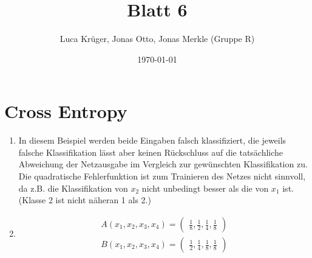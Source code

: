 \documentclass{article}
\title{Blatt 6}
\author{Luca Krüger, Jonas Otto, Jonas Merkle (Gruppe R)}
\date{\today}
\begin{document}
\maketitle

\section{Cross Entropy}

\begin{enumerate}
  \item
        In diesem Beispiel werden beide Eingaben falsch klassifiziert, die jeweils falsche Klassifikation lässt aber keinen Rückschluss auf die tatsächliche Abweichung der Netzausgabe im Vergleich zur gewünschten Klassifikation zu. Die quadratische Fehlerfunktion ist zum Trainieren des Netzes nicht sinnvoll, da z.B. die Klassifikation von $x_2$ nicht unbedingt besser als die von $x_1$ ist. (Klasse 2 ist nicht \glqq näher\grqq an 1 als 2.)
  \item
        \begin{align*}
          A(x_1,x_2,x_3,x_4)=\begin{pmatrix}\frac{1}{8}, \frac{1}{2}, \frac{1}{4}, \frac{1}{8}\end{pmatrix} \\
          B(x_1,x_2,x_3,x_4)=\begin{pmatrix}\frac{1}{2}, \frac{1}{4}, \frac{1}{8}, \frac{1}{8}\end{pmatrix}
        \end{align*}


\end{enumerate}
\end{document}
